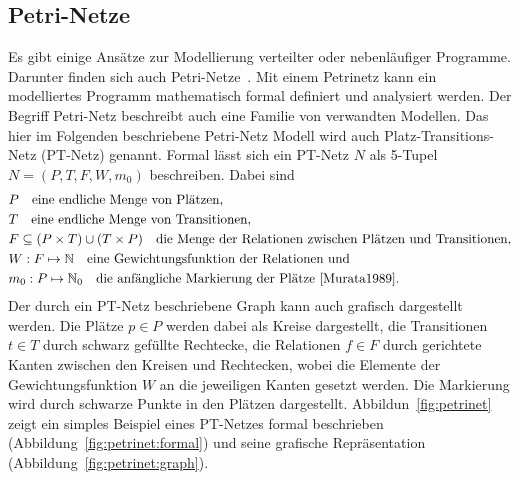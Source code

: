 \subsection{Petri-Netze}
Es gibt einige Ansätze zur Modellierung verteilter oder nebenläufiger Programme. Darunter finden sich auch Petri-Netze~\cite{Murata1989}. Mit einem Petrinetz kann ein modelliertes Programm mathematisch formal definiert und analysiert werden. Der Begriff Petri-Netz beschreibt auch eine Familie von verwandten Modellen. Das hier im Folgenden beschriebene Petri-Netz Modell wird auch Platz-Transitions-Netz (PT-Netz) genannt. Formal lässt sich ein PT-Netz $N$ als 5-Tupel $ N=(P,T,F,W,m_0)$ beschreiben. Dabei sind 
\begin{align*}
	&P  \quad \text{eine endliche Menge von Plätzen,}\\
	&T  \quad \text{eine endliche Menge von Transitionen,}\\
	&F \subseteq (P\times T) \cup (T \times P) \quad \text{die Menge der Relationen zwischen Plätzen und Transitionen,}\\
	&W: F \mapsto \mathbb{N}  \quad \text{eine Gewichtungsfunktion der Relationen und}\\
	&m_0: P \mapsto \mathbb{N}_0   \quad \text{die anfängliche Markierung der Plätze~\cite{Murata1989}.}\\
\end{align*}
Der durch ein PT-Netz beschriebene Graph kann auch grafisch dargestellt werden. Die Plätze $p \in P$ werden dabei als Kreise dargestellt, die Transitionen $ t \in T$ durch schwarz gefüllte Rechtecke, die Relationen $ f \in F$ durch gerichtete Kanten zwischen den Kreisen und Rechtecken, wobei die Elemente der Gewichtungsfunktion $W$ an die jeweiligen Kanten gesetzt werden. Die Markierung wird durch schwarze Punkte in den Plätzen dargestellt. Abbildun~\ref{fig:petrinet} zeigt ein simples Beispiel eines PT-Netzes  formal beschrieben (Abbildung~\ref{fig:petrinet:formal}) und seine grafische Repräsentation (Abbildung~\ref{fig:petrinet:graph}).

